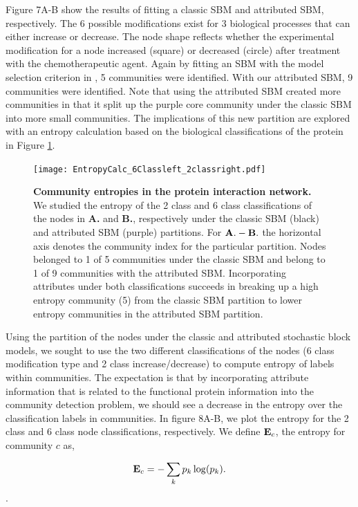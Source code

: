 Figure 7A-B show the results of fitting a classic SBM and attributed SBM, respectively.  The 6 possible modifications exist for 3 biological processes that can either increase or decrease. The node shape reflects whether the experimental modification for a node increased (square) or decreased (circle) after treatment with the chemotherapeutic agent. Again by fitting an SBM with the model selection criterion in \cite{dudin}, 5 communities were identified. With our attributed SBM, 9 communities were identified. Note that using the attributed SBM created more communities in that it split up the purple core community under the classic SBM into more small communities. The implications of this new partition are explored with an entropy calculation based on the biological classifications of the protein in Figure \ref{entropyFig}.
 \begin{figure}[h!]
\begin{center}
\texttt{[image: EntropyCalc\_6Classleft\_2classright.pdf]}
\caption{{\bf Community entropies in the protein interaction network.} We studied the entropy of the 2 class and 6 class classifications of the nodes in {\bf A.} and {\bf B.}, respectively under the classic SBM (black) and attributed SBM (purple) partitions. For ${\bf A.-B.}$ the horizontal axis denotes the community index for the particular partition. Nodes belonged to 1 of 5 communities under the classic SBM and belong to 1 of 9 communities with the attributed SBM. Incorporating attributes under both classifications succeeds in breaking up a high entropy community (5) from the classic SBM partition to lower entropy communities in the attributed SBM partition. }
\label{entropyFig}
\end{center}
\end{figure}

Using the partition of the nodes under the classic and attributed stochastic block models, we sought to use the two different classifications of the nodes (6 class modification type and 2 class increase/decrease) to compute entropy of labels within communities. The expectation is that by incorporating attribute information that is related to the functional protein information into the community detection problem, we should see a decrease in the entropy over the classification labels in communities. In figure 8A-B, we plot the entropy for the 2 class and 6 class node classifications, respectively. We define ${\bf E}_{c}$, the entropy for community $c$ as,

\begin{equation}
{\bf E}_{c}=-\sum_{k} p_{k}\log(p_{k}).
\end{equation}.

